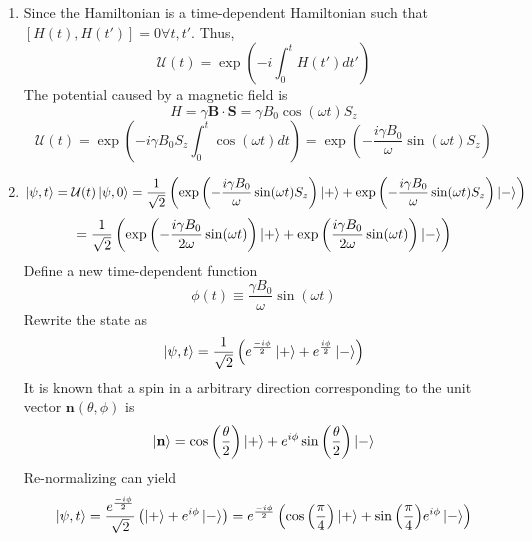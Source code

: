 \begin{sol}
\begin{enumerate}[label=\textbf{(\alph*)}]
\item 
 Since the Hamiltonian is a time-dependent Hamiltonian such that $[H(t),H(t')]=0\forall t,t'$. Thus, 
 \begin{equation}
	\mathcal U(t)=\exp\left(-i\int_0^t H(t')dt'\right)
\end{equation} 
 The potential caused by a magnetic field is 
 \begin{equation}
	H=\gamma\mathbf B\cdot\mathbf S=\gamma B_0\cos(\omega t)S_z
\end{equation} 
 \begin{equation}
	\mathcal U(t)=\exp\left(-i\gamma B_0S_z\int_0^t\cos(\omega t)dt\right)=\exp\left(-\frac{i\gamma B_0}{\omega}\sin(\omega t)S_z\right)
\end{equation} 
 \item
 \begin{equation}
	\ket{\psi,t}=\mathcal U(t)\ket{\psi,0}=\frac{1}{\sqrt{2}}\left(\exp\left(-\frac{i\gamma B_0}{\omega}\sin(\omega t)S_z\right)\ket{+}+\exp\left(-\frac{i\gamma B_0}{\omega}\sin(\omega t)S_z\right)\ket-\right)
\end{equation} 
 \begin{equation}
	=\frac{1}{\sqrt{2}}\left(\exp\left(-\frac{i\gamma B_0}{2\omega}\sin(\omega t)\right)\ket+ +\exp\left(\frac{i\gamma B_0}{2\omega}\sin(\omega t)\right)\ket-\right)
\end{equation} 
 Define a new time-dependent function \begin{equation}
	\phi(t)\equiv\frac{\gamma B_0}{\omega}\sin(\omega t)
\end{equation} 
 Rewrite the state as
 \begin{equation}
	\ket{\psi,t}=\frac{1}{\sqrt{2}}\left(e^{\frac{-i\phi}{2}}\ket++e^{\frac{i\phi}{2}}\ket-\right)
\end{equation} 
It is known that a spin in a arbitrary direction corresponding to the unit vector $\mathbf n(\theta, \phi)$ is
\begin{equation}
	\ket{\mathbf{n}}=\cos\left(\frac{\theta}{2}\right)\ket{+}+e^{i\phi}\sin\left(\frac{\theta}{2}\right)\ket{-}
\end{equation}
Re-normalizing can yield
 \begin{equation}
	\ket{\psi,t}=\frac{e^{\frac{-i\phi}{2}}}{\sqrt{2}}\left(\ket++e^{i\phi}\ket-\right)=e^{\frac{-i\phi}{2}}\left(\cos\Big(\frac{\pi}{4}\Big)\ket++\sin\Big(\frac{\pi}{4}\Big)e^{i\phi}\ket-\right)

\end{equation}
\end{enumerate}
\end{sol}
